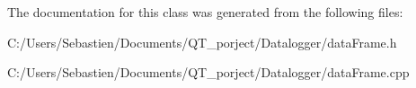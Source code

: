 The documentation for this class was generated from the following files\+:\begin{DoxyCompactItemize}
\item 
C\+:/\+Users/\+Sebastien/\+Documents/\+Q\+T\+\_\+porject/\+Datalogger/data\+Frame.\+h\item 
C\+:/\+Users/\+Sebastien/\+Documents/\+Q\+T\+\_\+porject/\+Datalogger/data\+Frame.\+cpp\end{DoxyCompactItemize}
